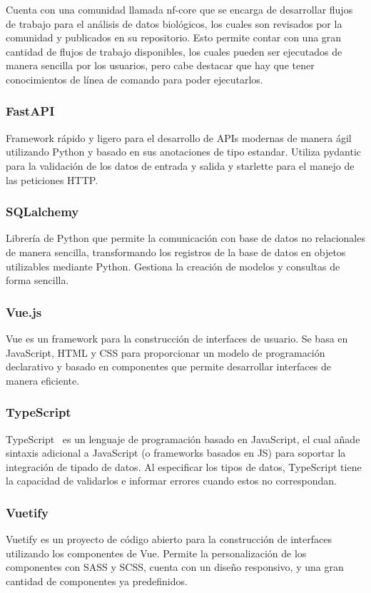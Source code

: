 Cuenta con una comunidad llamada nf-core que se encarga de desarrollar flujos de trabajo para el análisis de datos biológicos, los cuales son revisados por la comunidad y publicados en su repositorio. Esto permite contar con una gran cantidad de flujos de trabajo disponibles, los cuales pueden ser ejecutados de manera sencilla por los usuarios, pero cabe destacar que hay que tener conocimientos de línea de comando para poder ejecutarlos.



\subsubsection{FastAPI}
Framework rápido  y ligero para el desarrollo de APIs modernas de manera ágil utilizando Python y basado en sus anotaciones de tipo estandar.
Utiliza pydantic para la validación de los datos de entrada y salida y starlette para el manejo de las peticiones HTTP. %
\subsubsection{SQLalchemy}
Librería de Python que permite la comunicación con base de datos no relacionales de manera sencilla, transformando los registros de la base de datos en objetos utilizables mediante Python. Gestiona la creación de modelos y consultas de forma sencilla.
\subsubsection{Vue.js}
Vue es un framework para la construcción de interfaces de usuario. Se basa en JavaScript, HTML y CSS para proporcionar un modelo de programación declarativo y basado en componentes que permite desarrollar interfaces de manera eficiente.
\subsubsection{TypeScript}  
TypeScript~\cite{bierman2014understanding} es un lenguaje de programación basado en JavaScript, el cual añade sintaxis adicional a JavaScript (o frameworks basados en JS) para soportar la integración de tipado de datos. Al especificar los tipos de datos, TypeScript tiene la capacidad de validarlos e informar errores cuando estos no correspondan.
\subsubsection{Vuetify}
Vuetify es un proyecto de código abierto para la construcción de interfaces utilizando los componentes de Vue. Permite la personalización de los componentes con SASS y SCSS, cuenta con un diseño responsivo, y una gran cantidad de componentes ya predefinidos.
